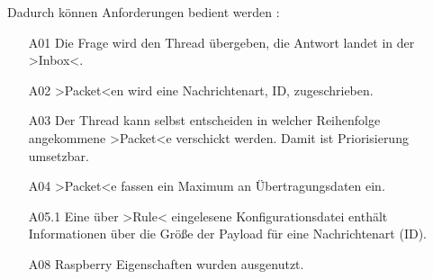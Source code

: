 Dadurch können Anforderungen bedient werden :
\begin{itemize}
	\item [A01] Die Frage wird den Thread übergeben, die Antwort landet in der >Inbox<.
	\item [A02] >Packet<en wird eine Nachrichtenart, ID, zugeschrieben.
	\item [A03] Der Thread kann selbst entscheiden in welcher Reihenfolge angekommene >Packet<e verschickt werden. Damit ist Priorisierung umsetzbar.
	\item [A04] >Packet<e fassen ein Maximum an Übertragungsdaten ein.
	\item [A05.1] Eine über >Rule< eingelesene Konfigurationsdatei enthält Informationen über die Größe der Payload für eine Nachrichtenart (ID).
	\item [A08] Raspberry Eigenschaften wurden ausgenutzt.
\end{itemize}

